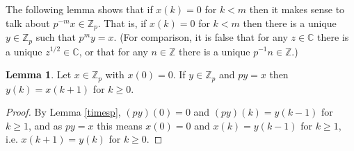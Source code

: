 \documentclass{article}
\theoremstyle{definition}
\newtheorem{lemma}[theorem]{Lemma}
\theoremstyle{definition}
\begin{document}
The following lemma shows that if $x(k)=0$ for $k<m$ then it makes sense to talk about $p^{-m}x \in \mathbb{Z}_p$. 
That is, if $x(k)=0$ for $k<m$ then there is a unique $y \in \mathbb{Z}_p$ such that $p^m y=x$. (For comparison,
it is false that for any $z \in \mathbb{C}$ there is a unique $z^{1/2} \in \mathbb{C}$, or that
for any $n \in \mathbb{Z}$ there is a unique $p^{-1}n \in \mathbb{Z}$.)


\begin{lemma}
Let $x \in \mathbb{Z}_p$ with $x(0)=0$. If $y \in \mathbb{Z}_p$ and $py=x$ then $y(k)=x(k+1)$ for $k \geq 0$.
\label{dividep}
\end{lemma}
\begin{proof}
By Lemma \ref{timesp}, $(py)(0)=0$ and $(py)(k)=y(k-1)$ for $k \geq 1$, and as $py=x$ this means
$x(0)=0$ and $x(k)=y(k-1)$ for $k \geq 1$, i.e. $x(k+1) = y(k)$ for $k \geq 0$. 
\end{proof}
 
 
\end{document}

